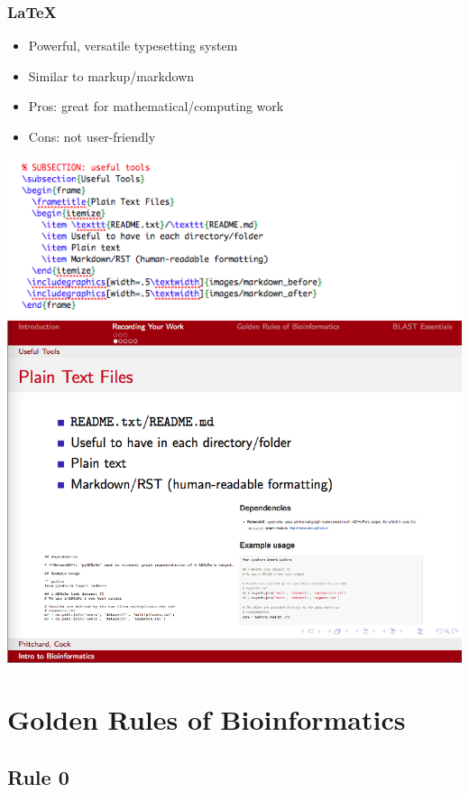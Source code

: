 \documentclass[table]{beamer}
\begin{document}
   \begin{frame}
     \frametitle{\LaTeX}
     \begin{itemize}
       \item Powerful, versatile typesetting system
       \item Similar to markup/markdown
       \item Pros: great for mathematical/computing work
       \item Cons: not user-friendly
     \end{itemize}
     \begin{center}
        \includegraphics[width=.35\textwidth]{images/latex_before}
        \includegraphics[width=.35\textwidth]{images/latex_after}     
     \end{center}
   \end{frame}

  \section{Golden Rules of Bioinformatics}

  \subsection{Rule 0}
\end{document}
